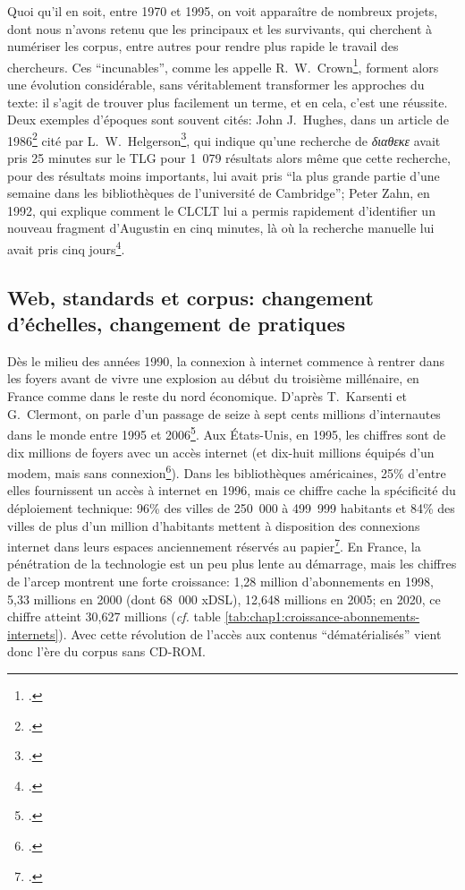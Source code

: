 Quoi qu'il en soit, entre 1970 et 1995, on voit apparaître de nombreux projets, dont nous n'avons retenu que les principaux et les survivants, qui cherchent à numériser les corpus, entre autres pour rendre plus rapide le travail des chercheurs. Ces \enquote{incunables}, comme les appelle R.~W.~Crown\footcite[p.~107]{crown_comparing_2000}, forment alors une évolution considérable, sans véritablement transformer les approches du texte: il s'agit de trouver plus facilement un terme, et en cela, c'est une réussite. Deux exemples d'époques sont souvent cités: John J.~Hughes, dans un article de 1986\footcite{hughes_ibycus_1986} cité par L.~W.~Helgerson\footcite{helgerson_cd-rom_1988}, qui indique qu'une recherche de \textit{διαθεκε} avait pris 25 minutes sur le TLG pour 1~079 résultats alors même que cette recherche, pour des résultats moins importants, lui avait pris \enquote{la plus grande partie d'une semaine dans les bibliothèques de l'université de Cambridge}; Peter Zahn, en 1992, qui explique comment le CLCLT lui a permis rapidement d'identifier un nouveau fragment d'Augustin en cinq minutes, là où la recherche manuelle lui avait pris cinq jours\footcite[p. 427]{zahn_kirchenvater-texte_1992}.

\subsection{Web, standards et corpus: changement d'échelles, changement de pratiques}

Dès le milieu des années 1990, la connexion à internet commence à rentrer dans les foyers avant de vivre une explosion au début du troisième millénaire, en France comme dans le reste du nord économique. D'après T.~Karsenti et G.~Clermont, on parle d'un passage de seize à sept cents millions d'internautes dans le monde entre 1995 et 2006\footcite{karsenti_les_2006}. Aux États-Unis, en 1995, les chiffres sont de dix millions de foyers avec un accès internet (et dix-huit millions équipés d'un modem, mais sans connexion\footcite{nw_americans_1995}). Dans les bibliothèques américaines, 25\% d'entre elles fournissent un accès à internet en 1996, mais ce chiffre cache la spécificité du déploiement technique: 96\% des villes de 250~000 à 499~999 habitants et 84\% des villes de plus d'un million d'habitants mettent à disposition des connexions internet dans leurs espaces anciennement réservés au papier\footcite{zumalt_internet_1998}. En France, la pénétration de la technologie est un peu plus lente au démarrage, mais les chiffres de l'\acrfull{arcep} montrent une forte croissance: 1,28 million d'abonnements en 1998, 5,33 millions en 2000 (dont 68~000 xDSL), 12,648 millions en 2005; en 2020, ce chiffre atteint 30,627 millions (\textit{cf.} table \ref{tab:chap1:croissance-abonnements-internets}). Avec cette révolution de l'accès aux contenus \enquote{dématérialisés} vient donc l'ère du corpus sans CD-ROM.

